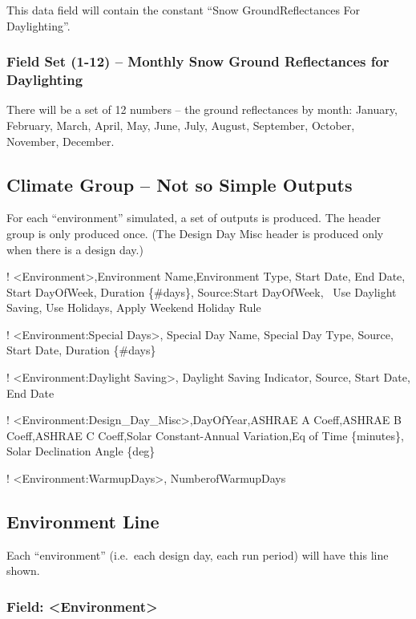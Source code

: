 This data field will contain the constant ``Snow GroundReflectances For Daylighting''.

\subsubsection{Field Set (1-12) -- Monthly Snow Ground Reflectances for Daylighting}\label{field-set-1-12-monthly-snow-ground-reflectances-for-daylighting}

There will be a set of 12 numbers -- the ground reflectances by month: January, February, March, April, May, June, July, August, September, October, November, December.

\subsection{Climate Group -- Not so Simple Outputs}\label{climate-group-not-so-simple-outputs}

For each ``environment'' simulated, a set of outputs is produced. The header group is only produced once. (The Design Day Misc header is produced only when there is a design day.)

! \textless{}Environment\textgreater{},Environment Name,Environment Type, Start Date, End Date, Start DayOfWeek, Duration \{\#days\}, Source:Start DayOfWeek,~ Use Daylight Saving, Use Holidays, Apply Weekend Holiday Rule

! \textless{}Environment:Special Days\textgreater{}, Special Day Name, Special Day Type, Source, Start Date, Duration \{\#days\}

! \textless{}Environment:Daylight Saving\textgreater{}, Daylight Saving Indicator, Source, Start Date, End Date

! \textless{}Environment:Design\_Day\_Misc\textgreater{},DayOfYear,ASHRAE A Coeff,ASHRAE B Coeff,ASHRAE C Coeff,Solar Constant-Annual Variation,Eq of Time \{minutes\}, Solar Declination Angle \{deg\}

! \textless{}Environment:WarmupDays\textgreater{}, NumberofWarmupDays

\subsection{Environment Line}\label{environment-line}

Each ``environment'' (i.e.~each design day, each run period) will have this line shown.

\subsubsection{Field: \textless{}Environment\textgreater{}}\label{field-environment}

